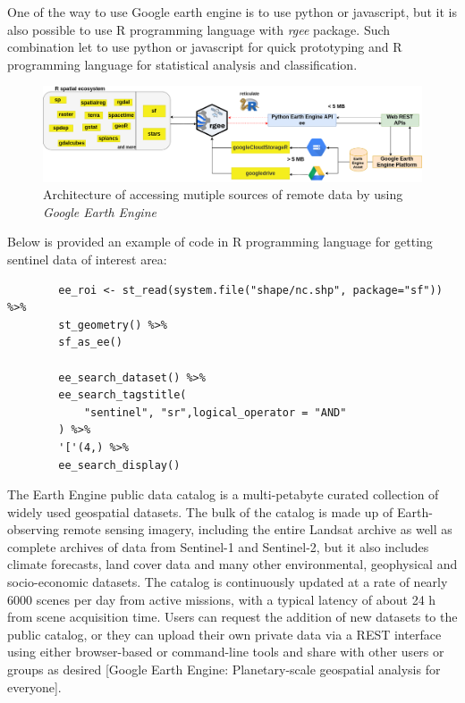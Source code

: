 	One of the way to use Google earth engine is to use python or javascript, but it is also possible to use R programming language with \textit{rgee} package. Such combination let to use python or javascript for quick prototyping and R programming language for statistical analysis and classification.
	
	\begin{figure}[H]
		\centering
		\includegraphics[width=1.0\linewidth]{images/gee.png}
		\caption{Architecture of accessing mutiple sources of remote data by using \textit{Google Earth Engine}}
		\label{fig:gee}
	\end{figure}
	
	Below is provided an example of code  in R programming language for getting sentinel data of interest area:
	
	\begin{lstlisting}
		ee_roi <- st_read(system.file("shape/nc.shp", package="sf")) %>%
		st_geometry() %>%
		sf_as_ee()
		
		ee_search_dataset() %>% 
		ee_search_tagstitle(
			"sentinel", "sr",logical_operator = "AND"
		) %>% 
		'['(4,) %>%
		ee_search_display()
	\end{lstlisting}
	
	The Earth Engine public data catalog is a multi-petabyte curated collection of widely used geospatial datasets. The bulk of the catalog is made up of Earth-observing remote sensing imagery, including the entire Landsat archive as well as complete archives of data from Sentinel-1 and Sentinel-2, but it also includes climate forecasts, land cover data and many other environmental, geophysical and socio-economic datasets. The catalog is continuously updated at a rate of nearly 6000 scenes per day from active missions, with a typical latency of about 24 h from scene acquisition time. Users can request the addition of new datasets to the public catalog, or they can upload their own private data via a REST interface using either browser-based or command-line tools and share with other users or groups as desired [Google Earth Engine: Planetary-scale geospatial analysis for everyone].
	
	

